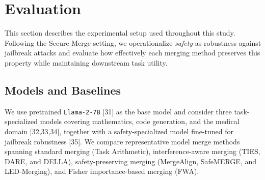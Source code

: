 \documentclass{article}
\begin{document}


\section{Evaluation}

This section describes the experimental setup used throughout this study. Following the Secure Merge setting, we operationalize \emph{safety} as robustness against jailbreak attacks and evaluate how effectively each merging method preserves this property while maintaining downstream task utility.

\subsection{Models and Baselines}

We use pretrained \texttt{Llama-2-7B} [31] as the base model and consider three task-specialized models covering mathematics, code generation, and the medical domain [32,33,34], together with a safety-specialized model fine-tuned for jailbreak robustness [35]. We compare representative model merge methods spanning standard merging (Task Arithmetic), interference-aware merging (TIES, DARE, and DELLA), safety-preserving merging (MergeAlign, SafeMERGE, and LED-Merging), and Fisher importance-based merging (FWA).
\end{document}
